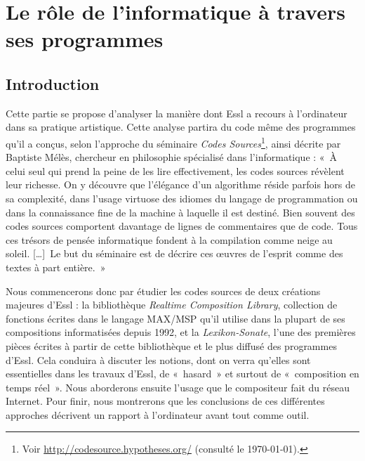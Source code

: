 \documentclass[a4paper,12pt]{article}
\newcommand{\guill}[1]{«~#1~»}
\newcommand{\zitat}[2]{\#Citation(#2)\#}
\newcommand{\tpp}[0]{[\dots]}
\begin{document}



\section{Le rôle de l'informatique à travers ses programmes}

\subsection{Introduction}

Cette partie se propose d'analyser la manière dont Essl a recours à l'ordinateur dans sa pratique artistique. Cette analyse partira du code même des programmes qu'il a conçus, selon l'approche du séminaire \emph{Codes Sources}\footnote{Voir \href{http://codesource.hypotheses.org/}{http://codesource.hypotheses.org/} (consulté le \today).}, ainsi décrite par Baptiste Mélès, chercheur en philosophie spécialisé dans l'informatique : \guill{À celui seul qui prend la peine de les lire effectivement, les codes sources révèlent leur richesse. On y découvre que l’élégance d’un algorithme réside parfois hors de sa complexité, dans l’usage virtuose des idiomes du langage de programmation ou dans la connaissance fine de la machine à laquelle il est destiné. Bien souvent des codes sources comportent davantage de lignes de commentaires que de code. Tous ces trésors de pensée informatique fondent à la compilation comme neige au soleil. \tpp~Le but du séminaire est de décrire ces œuvres de l’esprit comme des textes à part entière.}

Nous commencerons donc par étudier les codes sources de deux créations majeures d'Essl : la bibliothèque \emph{Realtime Composition Library}, collection de fonctions écrites dans le langage MAX/MSP qu'il utilise dans la plupart de ses compositions informatisées depuis 1992, et la \emph{Lexikon-Sonate}, l'une des premières pièces écrites à partir de cette bibliothèque et le plus diffusé des programmes d'Essl. Cela conduira à discuter les notions, dont on verra qu'elles sont essentielles dans les travaux d'Essl, de \guill{hasard} et surtout de \guill{composition en temps réel}. Nous aborderons ensuite l'usage que le compositeur fait du réseau Internet. Pour finir, nous montrerons que les conclusions de ces différentes approches décrivent un rapport à l'ordinateur avant tout comme outil.
\end{document}
